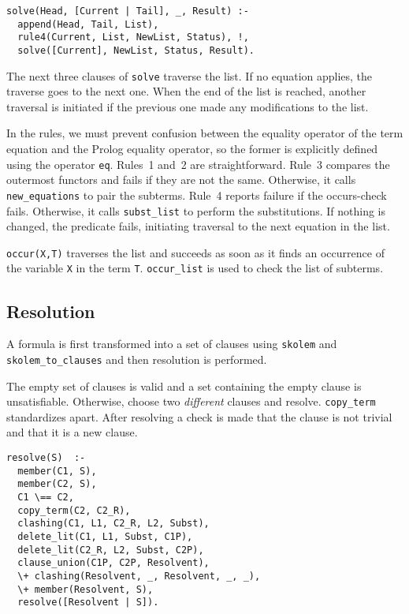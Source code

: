\documentclass[11pt]{article}
\newcommand*{\p}[1]{\textup{\texttt{#1}}}
\begin{document}
\begin{verbatim}
solve(Head, [Current | Tail], _, Result) :-
  append(Head, Tail, List),
  rule4(Current, List, NewList, Status), !,
  solve([Current], NewList, Status, Result).
\end{verbatim}

The next three clauses of \p{solve} traverse the list. If no equation
applies, the traverse goes to the next one. When the end of the list is
reached, another traversal is initiated if the previous one made any
modifications to the list.

In the rules, we must prevent confusion between the equality operator of
the term equation and the Prolog equality operator, so the former is
explicitly defined using the operator \p{eq}. Rules~1 and~2 are
straightforward. Rule~3 compares the outermost functors and fails if
they are not the same. Otherwise, it calls \p{new\_equations} to pair
the subterms. Rule~4 reports failure if the occurs-check fails.
Otherwise, it calls \p{subst\_list} to perform the substitutions. If
nothing is changed, the predicate fails, initiating traversal to the
next equation in the list.

\p{occur(X,T)} traverses the list and succeeds as soon as it finds an
occurrence of the variable \p{X} in the term \p{T}. \p{occur\_list} is
used to check the list of subterms.




\subsection{Resolution}\label{s.resfol}

A formula is first transformed into a set of clauses using \p{skolem}
and \p{skolem\_to\_clauses} and then resolution is performed.

The empty set of clauses is valid and a set containing the empty clause
is unsatisfiable. Otherwise, choose two \emph{different} clauses and
resolve. \p{copy\_term} standardizes apart. After resolving a check is
made that the clause is not trivial and that it is a new clause.
\begin{verbatim}
resolve(S)  :-
  member(C1, S),
  member(C2, S),
  C1 \== C2,
  copy_term(C2, C2_R),
  clashing(C1, L1, C2_R, L2, Subst),
  delete_lit(C1, L1, Subst, C1P),
  delete_lit(C2_R, L2, Subst, C2P),
  clause_union(C1P, C2P, Resolvent),
  \+ clashing(Resolvent, _, Resolvent, _, _),
  \+ member(Resolvent, S),
  resolve([Resolvent | S]).
\end{verbatim}
\end{document}
